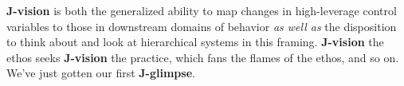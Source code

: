 \documentclass{article}
\begin{document}
\textbf{J-vision} is both the generalized ability to map changes in high-leverage control variables to those in downstream domains of behavior \textit{as well as} the disposition to think about and look at hierarchical systems in this framing. \textbf{J-vision} the ethos seeks \textbf{J-vision} the practice, which fans the flames of the ethos, and so on. We've just gotten our first \textbf{J-glimpse}. 
\end{document}
